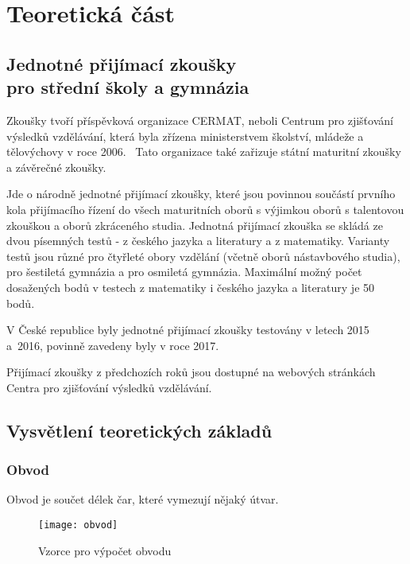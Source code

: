 \chapter{Teoretická část}


\section[Jednotné přijímací zkoušky pro střední školy a gymnázia]{Jednotné přijímací zkoušky\\pro střední školy a gymnázia}

Zkoušky tvoří příspěvková organizace CERMAT, neboli Centrum pro zjišťování výsledků vzdělávání, která byla zřízena ministerstvem školství, mládeže a tělovýchovy v roce 2006.~\cite{zakon_CERMAT} Tato organizace také zařizuje státní maturitní zkoušky a závěrečné zkoušky.~\cite{CERMAT_p_m}



Jde o národně jednotné přijímací zkoušky, které jsou povinnou součástí prvního kola přijímacího řízení do všech maturitních oborů s výjimkou oborů s talentovou zkouškou a oborů zkráceného studia.
Jednotná přijímací zkouška se skládá ze dvou písemných testů - z českého jazyka a literatury a z matematiky.
Varianty testů jsou různé pro čtyřleté obory vzdělání (včetně oborů nástavbového studia), pro šestiletá gymnázia a pro osmiletá gymnázia.
Maximální možný počet dosažených bodů v testech z matematiky i českého jazyka a literatury je 50 bodů.~\cite{CERMAT_co_to_je}

V České republice byly jednotné přijímací zkoušky testovány v letech 2015 a~2016, povinně zavedeny byly v roce 2017.~\cite{CERMAT_rocni_zprava}

Přijímací zkoušky z předchozích roků jsou dostupné na webových stránkách Centra pro zjišťování výsledků vzdělávání.~\cite{CERMAT_pdfka}

\section{Vysvětlení teoretických základů}
\subsection{Obvod}
Obvod je součet délek čar, které vymezují nějaký útvar. \cite{umim_mat}

\begin{figure}[p]
	\caption{Vzorce pro výpočet obvodu \cite{umim_mat}}
	\centering
	\texttt{[image: obvod]}
\end{figure}

